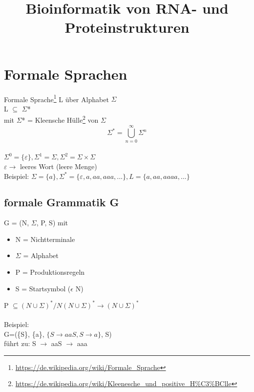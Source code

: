 \documentclass[12pt]{article}
\title{\Huge\textbf{Bioinformatik von RNA- und Proteinstrukturen}}
\author{}
\date{}
\begin{document}
\begin{titlepage}

\maketitle
\thispagestyle{empty}
\end{titlepage}
\newpage

\begin{titlepage}
\tableofcontents
\thispagestyle{empty}
\end{titlepage}
\newpage

\section{Formale Sprachen}

Formale Sprache\footnote{\url{https://de.wikipedia.org/wiki/Formale\_Sprache}}
L über Alphabet $\Sigma$\\
L $\subseteq$ $\Sigma$*\\
mit $\Sigma$* = Kleensche Hülle\footnote{\url{https://de.wikipedia.org/wiki/Kleenesche\_und\_positive\_H\%C3\%BClle}} von $\Sigma$\\


$$\Sigma^* = \bigcup_{n=0}^{\infty} \Sigma^{n}$$\\
$\Sigma^0 = \{\varepsilon\}, \Sigma^1 = \Sigma, \Sigma^2 = \Sigma \times \Sigma$\\
$\varepsilon \to$ leeres Wort (leere Menge)\\

Beispiel: $\Sigma = \{a\}, \Sigma^*=\{\varepsilon, a, aa, aaa, ...\}, L = \{a, aa, aaaa, ...\}$

\subsection{formale Grammatik G}

G = (N, $\Sigma$, P, S) mit\\
\begin{itemize}
	\item N = Nichtterminale
	\item $\Sigma$ = Alphabet
	\item P = Produktionsregeln
	\item S = Startsymbol ($\epsilon$ N)
\end{itemize}

P $\subseteq (N \cup \Sigma)^* / N(N \cup \Sigma)^* \to (N \cup \Sigma)^*$\\
\\
Beispiel:\\
G=(\{S\}, \{a\}, $\{S \to aaS, S \to a\}$, S)\\
führt zu: S $\to$ aaS $\to$ aaa
\end{document}

